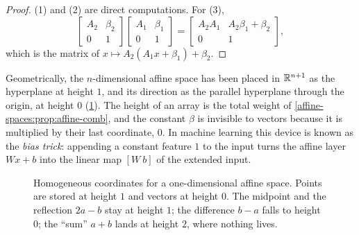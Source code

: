 \begin{notechapter}
\begin{proof}
(1) and (2) are direct computations. For (3),
\[
  \begin{bmatrix}A_2 & \beta_2\\0 & 1\end{bmatrix}
  \begin{bmatrix}A_1 & \beta_1\\0 & 1\end{bmatrix}
  = \begin{bmatrix}A_2A_1 & A_2\beta_1 + \beta_2\\0 & 1\end{bmatrix},
\]
which is the matrix of $x\mapsto A_2(A_1x + \beta_1) + \beta_2$.
\end{proof}

Geometrically, the $n$-dimensional affine space has been placed in
$\mathbb{R}^{n+1}$ as the hyperplane at height $1$, and its direction as the
parallel hyperplane through the origin, at height $0$
(\cref{affine-spaces:fig:homogeneous}). The height of an array is the
total weight of \cref{affine-spaces:prop:affine-comb}, and the constant
$\beta$ is invisible to vectors because it is multiplied by their last
coordinate, $0$. In machine learning this device is known as the
\emph{bias trick}: appending a constant feature $1$ to the input turns the
affine layer $Wx + b$ into the linear map $[W\ b]$ of the extended input.

\begin{figure}[ht]
\centering
{}
\caption{Homogeneous coordinates for a one-dimensional affine space. Points
are stored at height $1$ and vectors at height $0$. The midpoint and the
reflection $2a - b$ stay at height $1$; the difference $b - a$ falls to
height $0$; the ``sum'' $a + b$ lands at height $2$, where nothing lives.}
\label{affine-spaces:fig:homogeneous}
\end{figure}


\end{notechapter}
